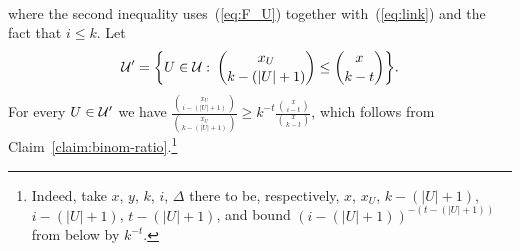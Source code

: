 \documentclass[11pt]{article}
\makeatletter
\renewenvironment{proof}[1][\proofname]
{\par\pushQED{\qed}
	\normalfont\topsep6\p@\@plus6\p@\relax\trivlist
	\item[\hskip\labelsep\bfseries#1\@addpunct{.}]
	\ignorespaces}
{\popQED\endtrivlist\@endpefalse}
\newcommand{\FF}{{\cal F}}
\newcommand{\UU}{{\cal U}}
\renewcommand{\d}{\delta}
\newcommand{\D}{\Delta}
\newcommand{\N}{\mathbb{N}}
\makeatother
\begin{document}
\begin{proof}[Proof of Theorem~\ref{th:skk}]
\begin{align}
	\end{align}
	where the second inequality uses~(\ref{eq:F_U}) together with~(\ref{eq:link}) and the fact that $i \le k$.
	Let 
	$$\UU' = \bigg\{ U \in \UU \,\colon\, \binom{x_U}{k-(|U|+1)} \le \binom{x}{k-t} \bigg\}.$$
%
	For every $U \in \UU'$ we have $\frac{\binom{x_U}{i-(|U|+1)}}{\binom{x_U}{k-(|U|+1)}} \ge k^{-t} \frac{\binom{x}{i-t}}{\binom{x}{k-t}}$,
	which follows from Claim~\ref{claim:binom-ratio}.\footnote{Indeed, take $x$, $y$, $k$, $i$, $\D$ there to be, respectively, $x$, $x_U$, $k-(|U|+1)$, $i-(|U|+1)$,  $t-(|U|+1)$, and bound $(i-(|U|+1))^{-(t-(|U|+1))}$ from below by $k^{-t}$.}
%

\end{proof}
\end{document}
